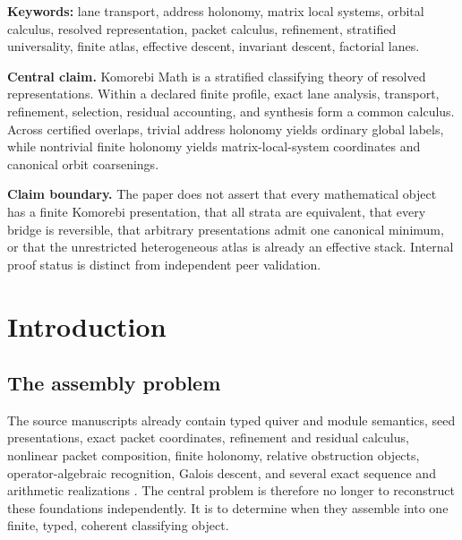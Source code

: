\documentclass[11pt]{article}
\theoremstyle{definition}
\theoremstyle{remark}
\begin{document}
\begin{center}
\small\textbf{Keywords:} lane transport, address holonomy, matrix local systems, orbital calculus, resolved representation, packet calculus, refinement, stratified universality, finite atlas, effective descent, invariant descent, factorial lanes.
\end{center}

\begin{claimbox}
\textbf{Central claim.}
Komorebi Math is a stratified classifying theory of resolved representations. Within a declared finite profile, exact lane analysis, transport, refinement, selection, residual accounting, and synthesis form a common calculus. Across certified overlaps, trivial address holonomy yields ordinary global labels, while nontrivial finite holonomy yields matrix-local-system coordinates and canonical orbit coarsenings.
\end{claimbox}

\begin{boundarybox}
\textbf{Claim boundary.}
The paper does not assert that every mathematical object has a finite Komorebi presentation, that all strata are equivalent, that every bridge is reversible, that arbitrary presentations admit one canonical minimum, or that the unrestricted heterogeneous atlas is already an effective stack. Internal proof status is distinct from independent peer validation.
\end{boundarybox}

\tableofcontents
\clearpage
{}

\section{Introduction}

\subsection{The assembly problem}

The source manuscripts already contain typed quiver and module semantics, seed presentations, exact packet coordinates, refinement and residual calculus, nonlinear packet composition, finite holonomy, relative obstruction objects, operator-algebraic recognition, Galois descent, and several exact sequence and arithmetic realizations \cite{P1,RT,P3,GAL,SEQ}. The central problem is therefore no longer to reconstruct these foundations independently. It is to determine when they assemble into one finite, typed, coherent classifying object.
\end{document}
